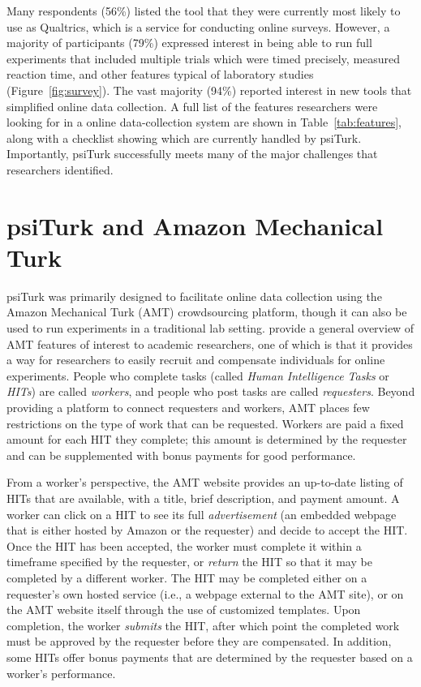 \documentclass[twocolumn]{svjour3}          %
\newcommand{\psiturk}[0]{\textsf{psiTurk}}
\begin{document}
Many respondents (56\%) listed the tool that they were currently most likely to use as Qualtrics, which is a service for conducting online surveys. However, a majority of participants (79\%) expressed interest in 
being able to run full experiments that included multiple trials which were timed precisely, 
measured reaction time, and other features typical of laboratory studies
(Figure~\ref{fig:survey}). The vast majority (94\%) reported interest in new tools that 
simplified online data collection. A full list of the features researchers were looking for in a 
online data-collection system are shown in Table~\ref{tab:features}, along with a checklist 
showing which are currently handled by \psiturk{}.  Importantly, \psiturk{} successfully
meets many of the major challenges that researchers identified.


\section{\psiturk{} and Amazon Mechanical Turk} 

\psiturk{} was primarily designed to facilitate online data collection using
the Amazon Mechanical Turk (AMT) crowdsourcing platform, though it can also be
used to run experiments in a traditional lab setting.
\cite{Mason:2012xy} provide a general overview of AMT features of
interest to academic researchers, one of which is that it provides a way for researchers
to easily recruit and compensate individuals for online experiments.  
People who complete tasks (called \emph{Human Intelligence Tasks} or \emph{HITs}) are 
called \emph{workers}, and people who post tasks are called \emph{requesters}.
Beyond providing a platform to connect requesters and workers, AMT places few restrictions 
on the type of work that can be requested.  Workers are 
paid a fixed amount for each HIT they complete; this amount is determined by the requester and
can be supplemented with bonus payments for good performance.

From a worker's perspective, the AMT website provides an up-to-date listing of HITs that 
are available, with a title, brief description, and payment amount.  A worker can click on a HIT to 
see its full \emph{advertisement} (an embedded webpage that is either hosted by
Amazon or the requester) and decide to accept the HIT. Once the HIT has been accepted,
the worker must complete it within a timeframe specified by the requester, or \emph{return} the HIT
so that it may be completed by a different worker. The HIT may be completed either 
on a requester's own hosted service (i.e., a webpage 
external to the AMT site), or on the AMT website itself through the use of customized templates.
Upon completion, the worker \emph{submits} the HIT, after which point the completed work must 
be approved by the requester before they are compensated.
In addition, some HITs offer bonus payments that are determined by the requester based 
on a worker's performance.
\end{document}
